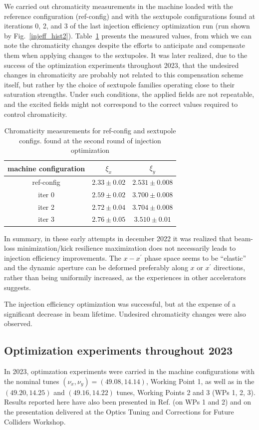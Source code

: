 We carried out chromaticity measurements in the machine loaded with the reference configuration (ref-config) and with the sextupole configurations found at iterations 0, 2, and 3 of the last injection efficiency optimization run
(run shown by Fig.~\ref{injeff_hist2}). Table~\ref{chrom} presents the measured values, from which we can note the chromaticity changes despite the efforts to anticipate and compensate them when applying changes to the sextupoles. It was later realized, due to the success of the optimization experiments throughout 2023, that the undesired changes in chromaticity are probably not related to this compensation scheme itself, but rather by the choice of sextupole families operating close to their saturation strengths. Under such conditions, the applied fields are not repeatable, and the excited fields might not correspond to the correct values required to control chromaticity.
\begin{table}[h]
\centering
\begin{tabular}{@{}ccc@{}}
\toprule
machine configuration & $\xi_x$       & $\xi_y$         \\ \midrule
ref-config   & $2.33\pm0.02$ & $2.531\pm0.008$ \\
iter 0   & $2.59\pm0.02$ & $3.700\pm0.008$   \\
iter 2   & $2.72\pm0.04$ & $3.704\pm0.008$ \\
iter 3   & $2.76\pm0.05$  & $3.510\pm0.01$   \\ \bottomrule
\end{tabular}
\caption{Chromaticity measurements for ref-config and sextupole configs. found at the second round of injection optimization}
\label{chrom}
\end{table}

In summary, in these early attempts in december 2022 it was realized that beam-loss minimization/kick resilience maximization does not necessarily leads to injection efficiency improvements. The $x-x^\prime$ phase space seems to be ``elastic'' and the dynamic aperture can be deformed preferably along $x$ or $x^\prime$ directions, rather than being uniformily increased, as the experiences in other accelerators suggests.

The injection efficiency optimization was successful, but at the expense of a significant decrease in beam lifetime. Undesired chromaticity changes were  also observed.
\subsection{Optimization experiments throughout 2023}
\label{experiments23}
In 2023, optimzation experiments were carried in the machine configurations with the nominal tunes $(\nu_x,\nu_y)=(49.08, 14.14)$, Working Point 1, as well as in the $(49.20, 14.25)$ and $(49.16, 14.22)$ tunes, Working Points 2 and 3 (WPs 1, 2, 3). Results reported here have also been presented in Ref.\cite{velloso:ipac23-wepl087} (on WPs 1 and 2) and on the presentation  delivered at the Optics Tuning and Corrections for Future Colliders Workshop.

